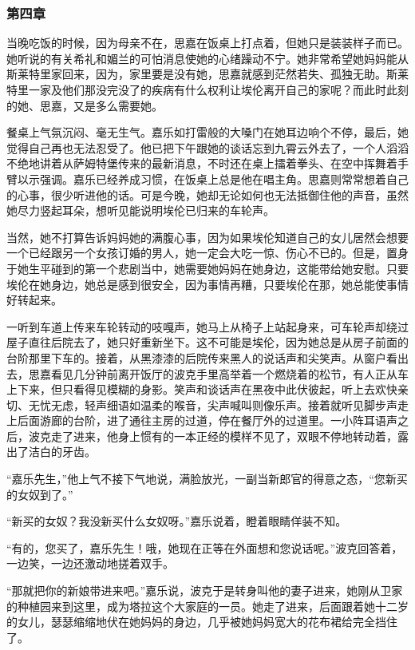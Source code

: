 \subsubsection{第四章}

\par 当晚吃饭的时候，因为母亲不在，思嘉在饭桌上打点着，但她只是装装样子而已。她听说的有关希礼和媚兰的可怕消息使她的心绪躁动不宁。她非常希望她妈妈能从斯莱特里家回来，因为，家里要是没有她，思嘉就感到茫然若失、孤独无助。斯莱特里一家及他们那没完没了的疾病有什么权利让埃伦离开自己的家呢？而此时此刻的她、思嘉，又是多么需要她。
\par 餐桌上气氛沉闷、毫无生气。嘉乐如打雷般的大嗓门在她耳边响个不停，最后，她觉得自己再也无法忍受了。他已把下午跟她的谈话忘到九霄云外去了，一个人滔滔不绝地讲着从萨姆特堡传来的最新消息，不时还在桌上擂着拳头、在空中挥舞着手臂以示强调。嘉乐已经养成习惯，在饭桌上总是他在唱主角。思嘉则常常想着自己的心事，很少听进他的话。可是今晚，她却无论如何也无法抵御住他的声音，虽然她尽力竖起耳朵，想听见能说明埃伦已归来的车轮声。
\par 当然，她不打算告诉妈妈她的满腹心事，因为如果埃伦知道自己的女儿居然会想要一个已经跟另一个女孩订婚的男人，她一定会大吃一惊、伤心不已的。但是，置身于她生平碰到的第一个悲剧当中，她需要她妈妈在她身边，这能带给她安慰。只要埃伦在她身边，她总是感到很安全，因为事情再糟，只要埃伦在那，她总能使事情好转起来。
\par 一听到车道上传来车轮转动的吱嘎声，她马上从椅子上站起身来，可车轮声却绕过屋子直往后院去了，她只好重新坐下。这不可能是埃伦，因为她总是从房子前面的台阶那里下车的。接着，从黑漆漆的后院传来黑人的说话声和尖笑声。从窗户看出去，思嘉看见几分钟前离开饭厅的波克手里高举着一个燃烧着的松节，有人正从车上下来，但只看得见模糊的身影。笑声和谈话声在黑夜中此伏彼起，听上去欢快亲切、无忧无虑，轻声细语如温柔的喉音，尖声喊叫则像乐声。接着就听见脚步声走上后面游廊的台阶，进了通往主房的过道，停在餐厅外的过道里。一小阵耳语声之后，波克走了进来，他身上惯有的一本正经的模样不见了，双眼不停地转动着，露出了洁白的牙齿。
\par “嘉乐先生，”他上气不接下气地说，满脸放光，一副当新郎官的得意之态，“您新买的女奴到了。”
\par “新买的女奴？我没新买什么女奴呀。”嘉乐说着，瞪着眼睛佯装不知。
\par “有的，您买了，嘉乐先生！哦，她现在正等在外面想和您说话呢。”波克回答着，一边笑，一边还激动地搓着双手。
\par “那就把你的新娘带进来吧。”嘉乐说，波克于是转身叫他的妻子进来，她刚从卫家的种植园来到这里，成为塔拉这个大家庭的一员。她走了进来，后面跟着她十二岁的女儿，瑟瑟缩缩地伏在她妈妈的身边，几乎被她妈妈宽大的花布裙给完全挡住了。
